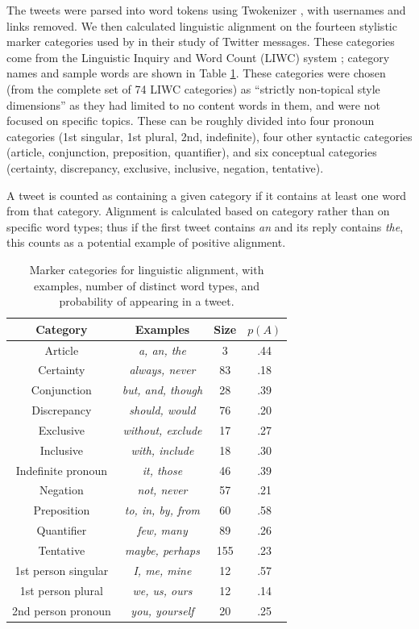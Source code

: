 \documentclass{acm_proc_article-sp}
\begin{document}
The tweets were parsed into word tokens using Twokenizer \cite{OwoputiEtAl2013}, with usernames and links removed.  We then calculated linguistic alignment on the fourteen stylistic marker categories used by \cite{DNMGamonDumais2011} in their study of Twitter messages.  These categories come from the Linguistic Inquiry and Word Count (LIWC) system \cite{LIWC}; category names and sample words are shown in Table \ref{tab:LIWC}. These categories were chosen (from the complete set of 74 LIWC categories) as ``strictly non-topical style dimensions'' as they had limited to no content words in them, and were not focused on specific topics.  These can be roughly divided into four pronoun categories (1st singular, 1st plural, 2nd, indefinite), four other syntactic categories (article, conjunction, preposition, quantifier), and six conceptual categories (certainty, discrepancy, exclusive, inclusive, negation, tentative).

A tweet is counted as containing a given category if it contains at least one word from that category.  Alignment is calculated based on category rather than on specific word types; thus if the first tweet contains \textit{an} and its reply contains \textit{the}, this counts as a potential example of positive alignment.

\begin{table}
\centering
\caption{Marker categories for linguistic alignment, with examples, number of distinct word types, and probability of appearing in a tweet.}\label{tab:LIWC}
\begin{tabular}{|c|c|c|c|} \hline
Category & Examples & Size & $p(A)$\\ \hline
Article & \textit{a, an, the} & 3 & .44 \\
Certainty  & \textit{always, never} & 83 & .18 \\
Conjunction  & \textit{but, and, though} & 28 & .39\\
Discrepancy  & \textit{should, would} & 76 & .20 \\
Exclusive  & \textit{without, exclude} & 17 & .27\\
Inclusive  & \textit{with, include} & 18 & .30\\
Indefinite pronoun  & \textit{it, those} & 46 & .39\\
Negation  & \textit{not, never} & 57 & .21\\
Preposition  & \textit{to, in, by, from} & 60 & .58\\
Quantifier  & \textit{few, many} & 89 & .26\\
Tentative & \textit{maybe, perhaps} & 155 & .23\\
1st person singular  & \textit{I, me, mine} & 12 & .57\\
1st person plural & \textit{we, us, ours} & 12 & .14\\
2nd person pronoun   & \textit{you, yourself} & 20 & .25\\
\hline\end{tabular}
\end{table}
\end{document}
